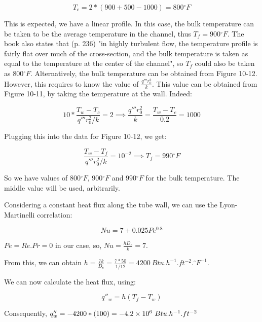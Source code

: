 \begin{equation}
T_c = 2*(900+500-1000) = 800{}^\circ F
\end{equation}

This is expected, we have a linear profile. In this case, the bulk temperature can be taken to be the average temperature in the channel, thus $T_f = 900{}^\circ F$. The book also states that (p. 236) "in highly turbulent flow, the temperature profile is fairly flat  over much of the cross-section, and the bulk temperature is taken as equal to the temperature at the center of the channel", so $T_f$ could also be taken as $800{}^\circ F$. Alternatively, the bulk temperature can be obtained from Figure 10-12. However, this requires to know the value of $\frac{q'''r_0^2}{k}$. This value can be obtained from Figure 10-11, by taking the temperature at the wall. Indeed:

\begin{equation}
10*\frac{T_w - T_c}{q'''r_0^2/k} = 2 \implies \frac{q'''r_0^2}{k} = \frac{T_w - T_c}{0.2} = 1000
\end{equation}

Plugging this into the data for Figure 10-12, we get:

\begin{equation}
\frac{T_w - T_f}{q'''r_0^2/k} = 10^{-2} \implies T_f = 990{}^\circ F
\end{equation}

So we have values of $800{}^\circ F$, $900{}^\circ F$ and $990{}^\circ F$ for the bulk temperature. The middle value will be used, arbitrarily.

Considering a constant heat flux along the tube wall, we can use the Lyon-Martinelli correlation:

\begin{equation}
Nu = 7 + 0.025Pe^{0.8}
\end{equation}

$Pe = Re.Pr = 0$ in our case, so, $Nu = \frac{hD_e}{k} = 7$.

From this, we can obtain $h = \frac{7k}{D_e} = \frac{7 * 50}{1/12} = 4200\ Btu.h^{-1}.ft^{-2}.{}^\circ F^{-1}$.

We can now calculate the heat flux, using:

\begin{equation}
q''_w = h(T_f - T_w)
\end{equation}

Consequently, $q''_w = - 4200 * (100) = -\text{\num{4.2e6}}\ Btu.h^{-1}.ft^{-2}$

